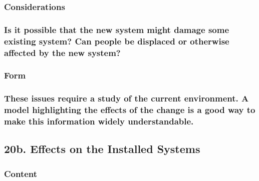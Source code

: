 \documentclass[
]{article}
\begin{document}
\hypertarget{considerations-47}{%
\subsubsection{Considerations}\label{considerations-47}}

\hypertarget{is-it-possible-that-the-new-system-might-damage-some-existing-system-can-people-be-displaced-or-otherwise-affected-by-the-new-system}{%
\subsubsection{\texorpdfstring{Is it possible that the new system might
damage some existing system? Can people be displaced or otherwise
affected by the new system?
}{Is it possible that the new system might damage some existing system? Can people be displaced or otherwise affected by the new system? }}\label{is-it-possible-that-the-new-system-might-damage-some-existing-system-can-people-be-displaced-or-otherwise-affected-by-the-new-system}}

\hypertarget{form-31}{%
\subsubsection{Form}\label{form-31}}

\hypertarget{these-issues-require-a-study-of-the-current-environment.-a-model-highlighting-the-effects-of-the-change-is-a-good-way-to-make-this-information-widely-understandable.}{%
\subsubsection{These issues require a study of the current environment.
A model highlighting the effects of the change is a good way to make
this information widely
understandable.}\label{these-issues-require-a-study-of-the-current-environment.-a-model-highlighting-the-effects-of-the-change-is-a-good-way-to-make-this-information-widely-understandable.}}

\hypertarget{b.-effects-on-the-installed-systems}{%
\subsection{\texorpdfstring{20b. Effects on the Installed Systems
}{20b. Effects on the Installed Systems }}\label{b.-effects-on-the-installed-systems}}

\hypertarget{content-65}{%
\subsubsection{Content}\label{content-65}}
\end{document}
